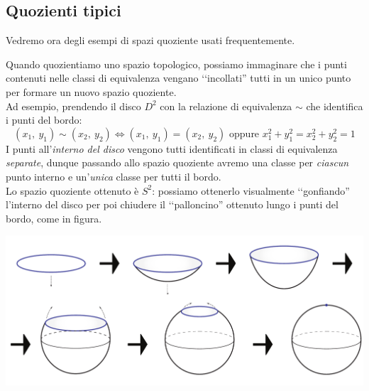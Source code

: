 	\subsection{Quozienti tipici}
Vedremo ora degli esempi di spazi quoziente usati frequentemente.
\begin{intuit}
	Quando quozientiamo uno spazio topologico, possiamo immaginare che i punti contenuti nelle classi di equivalenza vengano ‘‘incollati'' tutti in un unico punto per formare un nuovo spazio quoziente.\\
	Ad esempio, prendendo il disco $D^2$ con la relazione di equivalenza $\sim$ che identifica i punti del bordo:
	\begin{equation*}
		(x_1,\ y_1) \sim (x_2,\ y_2)\iff (x_1,\ y_1)=(x_2,\ y_2) \text{ oppure } x_1^2 +y_1^2= x_2^2 +y_2^2=1
	\end{equation*}
	I punti all'\textit{interno del disco} vengono tutti identificati in classi di equivalenza \textit{separate}, dunque passando allo spazio quoziente avremo una classe per \textit{ciascun} punto interno e un'\textit{unica} classe per tutti il bordo.\\
	Lo spazio quoziente ottenuto è $S^2$: possiamo ottenerlo visualmente ‘‘gonfiando'' l'interno del disco per poi chiudere il ‘‘palloncino'' ottenuto lungo i punti del bordo, come in figura.
	\begin{center}
		\includegraphics[trim=0cm 0cm 0cm 0cm,clip,scale=0.4]{images/disctosphere.pdf}
	\end{center}
\end{intuit}
